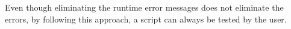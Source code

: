 \documentclass[runningheads,a4paper]{llncs}
\begin{document}
  Even though eliminating the runtime error messages does not eliminate the errors, by following this approach, a script can always be tested by the user.
\end{document}
